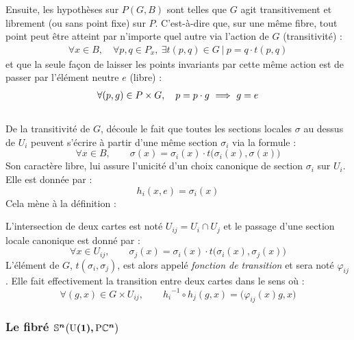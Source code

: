 Ensuite, les hypothèses sur $P(G,B)$ sont telles que $G$ agit transitivement et librement (ou sans point fixe) sur $P$. C'est-à-dire que, sur une même fibre, tout point peut être atteint par n'importe quel autre via l'action de $G$ (transitivité) :
\begin{align*}
	\forall x\in B,\quad \forall p,q\in P_x,\ \exists t(p,q)\in G\ |\ p = q\cdot t(p,q) 
\end{align*}
et que la seule façon de laisser les points invariants par cette même action est de passer par l'élément neutre $e$ (libre) :
\begin{align*}
	\forall (p,g)\in P\times G,\quad p = p\cdot g\ \Longrightarrow\ g=e
\end{align*}
\\
De la transitivité de $G$, découle le fait que toutes les sections locales $\sigma$ au dessus de $U_i$ peuvent s'écrire à partir d'une même section $\sigma_i$ via la formule :
\[\forall x\in B,\qquad \sigma(x) = \sigma_i(x) \cdot t\big(\sigma_i(x), \sigma(x)\big)\]
Son caractère libre, lui assure l'unicité d'un choix canonique de section $\sigma_i$ sur $U_i$. Elle est donnée par :
\[{h_i}(x,e) = \sigma_i(x)\]
Cela mène à la définition :
\begin{definition}
	L'intersection de deux cartes est noté $U_{ij} = U_i\cap U_j$ et le passage d'une section locale canonique est donné par :
	\[\forall x\in U_{ij},\qquad \sigma_j(x) = \sigma_i(x) \cdot t\big(\sigma_i(x), \sigma_j(x)\big)\]
	L'élément de $G$, $t(\sigma_i, \sigma_j)$, est alors appelé \emph{fonction de transition} et sera noté $\varphi_{ij}$. Elle fait effectivement la transition entre deux cartes dans le sens où :
	\[\forall (g,x)\in G\times U_{ij},\qquad {h_i}^{-1} \circ h_j(g,x) = \big( \varphi_{ij}(x)g, x \big)\]
\end{definition}
\skipl




\subsubsection{Le fibré $\boldsymbol{\mathbb{ S}^{n}\big(\text{\normalfont U}(1),\text{\normalfont P}\mathbb{C}^{n}\big)}$}\label{subsec:SUPC_VFP}

